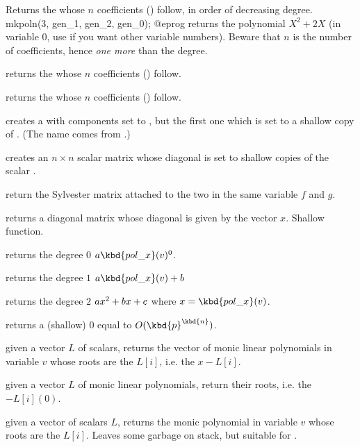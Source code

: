  Returns the  whose $n$
coefficients () follow, in order of decreasing degree.
\bprog
  mkpoln(3, gen_1, gen_2, gen_0);
@eprog
\noindent returns the polynomial $X^2 + 2X$ (in variable $0$, use
 if you want other variable numbers). Beware that $n$ is the
number of coefficients, hence \emph{one more} than the degree.

 returns the  whose $n$
coefficients () follow.

 returns the  whose $n$
coefficients () follow.

 creates a  with 
components set to , but the first one which is set to a shallow
copy of . (The name comes from .)

 creates an $n\times n$
scalar matrix whose diagonal is set to shallow copies of the scalar .

 return the Sylvester matrix
attached to the two  in the same variable $f$ and $g$.

 returns a diagonal matrix whose diagonal
is given by the vector $x$. Shallow function.

 returns the degree $0$
 $a \kbd{pol\_x}(v)^0$.

 returns the degree $1$
 $a\kbd{pol\_x}(v) + b$

 returns the degree $2$
 $a\*x^2+b\*x+c$ where $x=\kbd{pol\_x}(v)$.

 returns a (shallow) $0$
 equal to $O(\kbd{p}^\kbd{n})$.


 given a vector $L$ of scalars,
returns the vector of monic linear polynomials in variable $v$ whose roots
are the $L[i]$, i.e. the $x - L[i]$.

 given a vector $L$ of monic linear
polynomials, return their roots, i.e. the $- L[i](0)$.

 given a vector of scalars $L$,
returns the monic polynomial in variable $v$ whose roots are the $L[i]$.
Leaves some garbage on stack, but suitable for .

